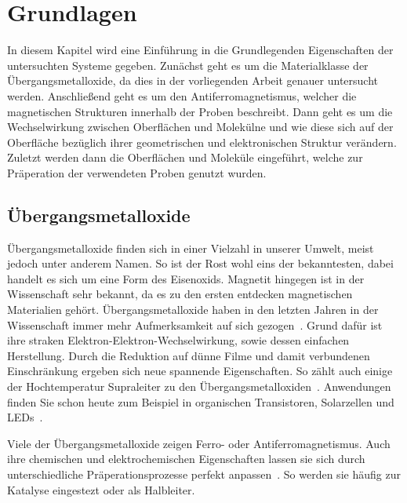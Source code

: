 \chapter{Grundlagen}
    In diesem Kapitel wird eine Einführung in die Grundlegenden Eigenschaften der untersuchten Systeme gegeben.
    Zunächst geht es um die Materialklasse der Übergangsmetalloxide, da dies in der vorliegenden Arbeit genauer untersucht werden.
    Anschließend geht es um den Antiferromagnetismus, welcher die magnetischen Strukturen innerhalb der Proben beschreibt.
    Dann geht es um die Wechselwirkung zwischen Oberflächen und Molekülne und wie diese sich auf der Oberfläche bezüglich ihrer geometrischen und elektronischen Struktur verändern.
    Zuletzt werden dann die Oberflächen und Moleküle eingeführt, welche zur Präperation der verwendeten Proben genutzt wurden.

    \section{Übergangsmetalloxide}
        Übergangsmetalloxide finden sich in einer Vielzahl in unserer Umwelt, meist jedoch unter anderem Namen.
        So ist der Rost wohl eins der bekanntesten, dabei handelt es sich um eine Form des Eisenoxids.
        Magnetit hingegen ist in der Wissenschaft sehr bekannt, da es zu den ersten entdecken magnetischen Materialien gehört.
        Übergangsmetalloxide haben in den letzten Jahren in der Wissenschaft immer mehr Aufmerksamkeit auf sich gezogen~\cite{IF_6}.
        Grund dafür ist ihre straken Elektron-Elektron-Wechselwirkung, sowie dessen einfachen Herstellung.
        Durch die Reduktion auf dünne Filme und damit verbundenen Einschränkung ergeben sich neue spannende Eigenschaften.
        So zählt auch einige der Hochtemperatur Supraleiter zu den Übergangsmetalloxiden~\cite{IF_5}.
        Anwendungen finden Sie schon heute zum Beispiel in organischen Transistoren, Solarzellen und LEDs~\cite{IF_3}.

        Viele der Übergangsmetalloxide zeigen Ferro- oder Antiferromagnetismus. 
        Auch ihre chemischen und elektrochemischen Eigenschaften lassen sie sich durch unterschiedliche Präperationsprozesse perfekt anpassen~\cite{Uni-Tübingen}.
        So werden sie häufig zur Katalyse eingestezt oder als Halbleiter.

